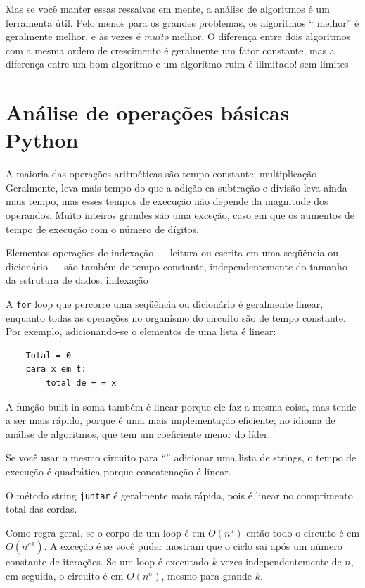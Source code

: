 \documentclass[10pt]{book}
\begin{document}
\begin{v erbatim}
Mas se você manter essas ressalvas em mente, a análise de algoritmos é um
ferramenta útil. Pelo menos para os grandes problemas, os algoritmos `` melhor''
é geralmente melhor, e às vezes é {\em muito} melhor. O
diferença entre dois algoritmos com a mesma ordem de crescimento é
geralmente um fator constante, mas a diferença entre um bom algoritmo
e um algoritmo ruim é ilimitado!
\index{} sem limites


\section{Análise de operações básicas Python}

A maioria das operações aritméticas são tempo constante; multiplicação
Geralmente, leva mais tempo do que a adição ea subtração e divisão
leva ainda mais tempo, mas esses tempos de execução não
depende da magnitude dos operandos. Muito inteiros grandes
são uma exceção, caso em que os aumentos de tempo de execução
com o número de dígitos.

Elementos operações de indexação --- leitura ou escrita em uma seqüência
ou dicionário --- são também de tempo constante, independentemente do tamanho
da estrutura de dados.
\index{} indexação

A {\tt for} loop que percorre uma seqüência ou dicionário é
geralmente linear, enquanto todas as operações no organismo
do circuito são de tempo constante. Por exemplo, adicionando-se o
elementos de uma lista é linear:

\begin{verbatim}
    Total = 0
    para x em t:
        total de + = x
\end{verbatim}

A função built-in {soma \tt} também é linear porque ele faz
a mesma coisa, mas tende a ser mais rápido, porque é uma mais
implementação eficiente; no idioma de análise de algoritmos,
que tem um coeficiente menor do líder.

Se você usar o mesmo circuito para ``'' adicionar uma lista de strings, o
tempo de execução é quadrática
porque concatenação é linear.

O método string {\tt juntar} é geralmente mais rápida, pois é
linear no comprimento total das cordas.

Como regra geral, se o corpo de um loop é em $ O (n ^ a) $ então
todo o circuito é em $ O (n ^ {a 1}) $. A exceção é se você puder
mostram que o ciclo sai após um número constante de iterações.
Se um loop é executado $ k $ vezes independentemente de $ n $, em seguida,
o circuito é em $ O (n ^ a) $, mesmo para grande $ k $.


\end{v erbatim}
\end{document}
